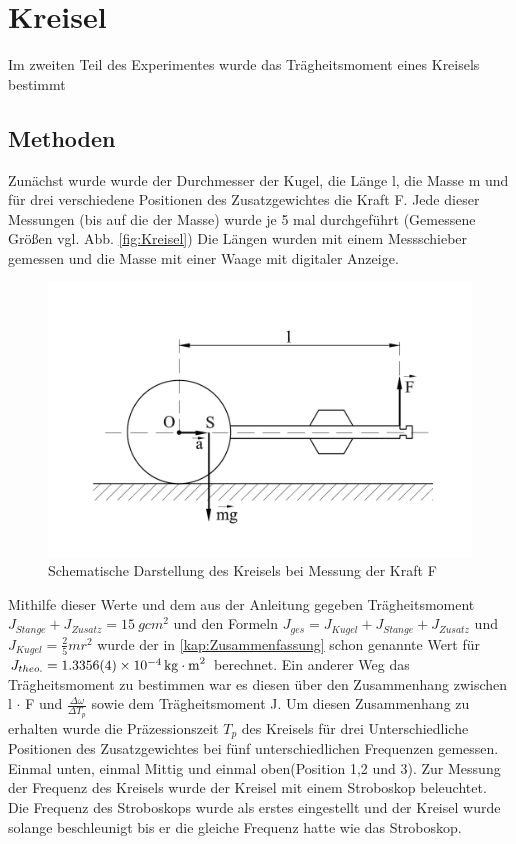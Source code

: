 \section{Kreisel}\label{kap:}
Im zweiten Teil des Experimentes wurde das Trägheitsmoment eines Kreisels bestimmt
\subsection{Methoden}
Zunächst wurde wurde der Durchmesser der Kugel, die Länge l, die Masse m und für drei verschiedene Positionen des Zusatzgewichtes die Kraft F.
Jede dieser Messungen (bis auf die der Masse) wurde je 5 mal durchgeführt (Gemessene Größen vgl. Abb. \ref{fig:Kreisel})
Die Längen  wurden mit einem Messschieber gemessen und die Masse mit einer Waage mit digitaler Anzeige.
\begin{figure}[h]
	\centering
	\includegraphics[width=0.7\linewidth]{res/KreiselAufbau.pdf}
	\caption{Schematische Darstellung des Kreisels bei Messung der Kraft F}
	\label{fig:kreisel}
\end{figure}
Mithilfe dieser Werte und dem aus der Anleitung gegeben Trägheitsmoment $J_{Stange}+J_{Zusatz}=\SI{15}{g cm^2}$ und den Formeln $J_{ges}=J_{Kugel}+J_{Stange}+J_{Zusatz}$ und $J_{Kugel}=\frac{2}{5}mr^2$ wurde der in \cref{kap:Zusammenfassung} schon genannte Wert für $J_{theo.}=\SI{1,3356+-0,0004e-4}{kg \cdot m^2}$ berechnet. Ein anderer Weg das Trägheitsmoment zu bestimmen war es diesen über den Zusammenhang zwischen l $\cdot$ F und  $\frac{\Delta \omega}{\Delta T_p}$ sowie dem Trägheitsmoment J. Um diesen Zusammenhang zu erhalten wurde die Präzessionszeit $T_p$ des Kreisels für drei Unterschiedliche Positionen des Zusatzgewichtes bei fünf unterschiedlichen Frequenzen gemessen. Einmal unten, einmal Mittig und einmal oben(Position 1,2 und 3). Zur Messung der Frequenz des Kreisels wurde der Kreisel mit einem Stroboskop beleuchtet. Die Frequenz des Stroboskops wurde als erstes eingestellt und der Kreisel wurde solange beschleunigt bis er die gleiche Frequenz hatte wie das Stroboskop.
